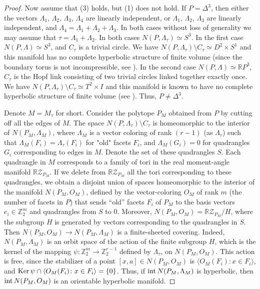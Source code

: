 \documentclass[12pt]{amsart}
\theoremstyle{definition}
\theoremstyle{remark}
\begin{document}
\begin{proof}
Now assume that (3) holds, but (1) does not hold. If $P=\Delta^3$, then either the 
vectors $\Lambda_1$, $\Lambda_2$, $\Lambda_3$, $\Lambda_4$ are linearly independent, or $\Lambda_1$, 
$\Lambda_2$, $\Lambda_3$ are linearly independent, and $\Lambda_4=\Lambda_1+\Lambda_2+\Lambda_3$. In both cases 
without loss of generality we may assume that $\tau=\Lambda_1+\Lambda_2$. In both cases $N(P,\Lambda_\tau)\simeq S^3$.
In the first case $N(P,\Lambda)\simeq S^3$, and $C_\tau$ is a trivial circle.
We have $N(P,\Lambda_\tau)\setminus C_\tau\simeq D^2\times S^1$ and 
this manifold has no complete hyperbolic structure of finite volume (since the boundary torus is not incompressible, see 
\cite[Proposition D.3.18(1)]{BP92}).
In the second case $N(P,\Lambda)\simeq \mathbb RP^3$,  $C_\tau$ is the Hopf 
link consisting of two trivial circles linked together exactly once. 
We have $N(P,\Lambda_\tau)\setminus C_\tau\simeq T^2\times I$ and this manifold
is known to have no complete hyperbolic structure of finite volume (see \cite[p. 359]{T82}). Thus, $P\ne\Delta^3$.

Denote $M=M_\tau$ for short. Consider the polytope $P_M$ obtained from $P$ by cutting off all the edges of $M$. 
The space $N(P,\Lambda_\tau)\setminus C_\tau$ is homeomorphic to the interior of $N(P_M,\Lambda_M)$, 
where $\Lambda_M$ is a vector coloring of rank $(r-1)$ (as $\Lambda_\tau$)
such that $\Lambda_M(F_i)=\Lambda_\tau(F_i)$ for "old" facets $F_i$, and $\Lambda_M(G_i)=0$ for  quadrangles $G_i$ 
corresponding to edges in $M$. Denote 
the set of these quadrangles $S$.
Each quadrangle in $M$ corresponds to a family of tori in the real moment-angle manifold
$\mathbb R\mathcal{Z}_{P_M}$. If we delete from $\mathbb R\mathcal{Z}_{P_M}$ all the tori corresponding to these 
quadrangles, we obtain a disjoint union of spaces homeomorphic to the interior of the manifold $N(P_M,O_M)$, 
defined by the vector-coloring $O_M$ of rank $m$ (the number of facets in $P$) that sends ``old'' facets $F_i$
of $P_M$ to the basis vectors $e_i\in\mathbb Z_2^m$ and quadrangles from $S$ to $0$. 
Moreover, $N(P_M,O_M)=\mathbb R\mathcal{Z}_{P_M}/H$, 
where the subgroup $H$ is generated by vectors corresponding to the quadrangles in  $S$.
Then $N(P_M,O_M)\to N(P_M,\Lambda_M)$ is a finite-sheeted covering. Indeed, $N(P_M,\Lambda_M)$
is an orbit space of the action of the finite subgroup $H$, which is the kernel of
the mapping $\psi\colon\mathbb Z_2^m\to \mathbb Z_2^{r-1}$ defined by $\Lambda_\tau$, on $N(P_M,O_M)$.
This action is free, since the stabilizer of a point $[x,a]\in N(P_M,O_M)$ is $\langle O_M(F_i)\colon x\in F_i\rangle$,
and  ${\rm Ker}\,\psi\cap \langle O_M(F_i)\colon x\in F_i\rangle=\{0\}$.  
Thus, if ${\rm int}\,N(P_M,\Lambda_M)$ is hyperbolic, then ${\rm int}\,N(P_M,O_M)$ is an orientable hyperbolic manifold.


\end{proof}
\end{document}
